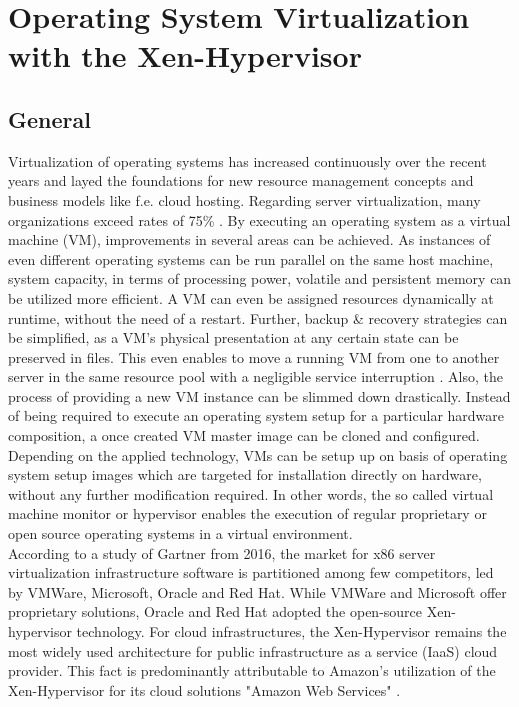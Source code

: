 \chapter{Operating System Virtualization with the Xen-Hypervisor}
\label{cha:2}

\section{General}\label{sec:xen-generall}

Virtualization of operating systems has increased continuously over the recent years and layed the foundations for new resource management concepts and business models like f.e. cloud hosting. Regarding server virtualization, many organizations exceed rates of 75\% \cite{gartnervmmarket}. By executing an operating system as a virtual machine (VM), improvements in several areas can be achieved. As instances of even different operating systems can be run parallel on the same host machine, system capacity, in terms of processing power, volatile and persistent memory can be utilized more efficient. A VM can even be assigned resources dynamically at runtime, without the need of a restart. Further, backup \& recovery strategies can be simplified, as a VM's physical presentation at any certain state can be preserved in files. This even enables to move a running VM from one to another server in the same resource pool with a negligible service interruption \cite{migratevms}. Also, the process of providing a new VM instance can be slimmed down drastically. Instead of being required to execute an operating system setup for a particular hardware composition, a once created VM master image can be cloned and configured. Depending on the applied technology, VMs can be setup up on basis of operating system setup images which are targeted for installation directly on hardware, without any further modification required. In other words, the so called virtual machine monitor or hypervisor enables the execution of regular proprietary or open source operating systems in a virtual environment. \\
According to a study of Gartner from 2016, the market for x86 server virtualization infrastructure software is partitioned among few competitors, led by VMWare, Microsoft, Oracle and Red Hat. While VMWare and Microsoft offer proprietary solutions, Oracle and Red Hat adopted the open-source Xen-hypervisor technology. For cloud infrastructures, the Xen-Hypervisor remains the most widely used architecture for public infrastructure as a service (IaaS) cloud provider. This fact is predominantly attributable to Amazon's utilization of the Xen-Hypervisor for its cloud solutions "Amazon Web Services" \cite{bittman2016magic}.
